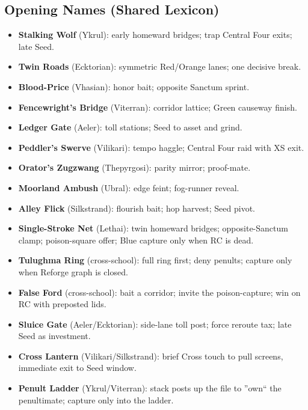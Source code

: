 \documentclass[11pt]{article}
\begin{document}
\subsection*{Opening Names (Shared Lexicon)}
\begin{itemize}\itemsep0.2em
  \item \textbf{Stalking Wolf} (Ykrul): early homeward bridges; trap Central Four exits; late Seed.
  \item \textbf{Twin Roads} (Ecktorian): symmetric Red/Orange lanes; one decisive break.
  \item \textbf{Blood-Price} (Vhasian): honor bait; opposite Sanctum sprint.
  \item \textbf{Fencewright's Bridge} (Viterran): corridor lattice; Green causeway finish.
  \item \textbf{Ledger Gate} (Aeler): toll stations; Seed to asset and grind.
  \item \textbf{Peddler's Swerve} (Vilikari): tempo haggle; Central Four raid with XS exit.
  \item \textbf{Orator's Zugzwang} (Thepyrgosi): parity mirror; proof-mate.
  \item \textbf{Moorland Ambush} (Ubral): edge feint; fog-runner reveal.
  \item \textbf{Alley Flick} (Silkstrand): flourish bait; hop harvest; Seed pivot.
  \item \textbf{Single-Stroke Net} (Lethai): twin homeward bridges; opposite-Sanctum clamp; poison-square offer; Blue capture only when RC is dead.
  \item \textbf{Tulughma Ring} (cross-school): full ring first; deny penults; capture only when Reforge graph is closed.
  \item \textbf{False Ford} (cross-school): bait a corridor; invite the poison-capture; win on RC with preposted lids.
  \item \textbf{Sluice Gate} (Aeler/Ecktorian): side-lane toll post; force reroute tax; late Seed as investment.
  \item \textbf{Cross Lantern} (Vilikari/Silkstrand): brief Cross touch to pull screens, immediate exit to Seed window.
  \item \textbf{Penult Ladder} (Ykrul/Viterran): stack posts up the file to ''own`` the penultimate; capture only into the ladder.
\end{itemize}
\end{document}
